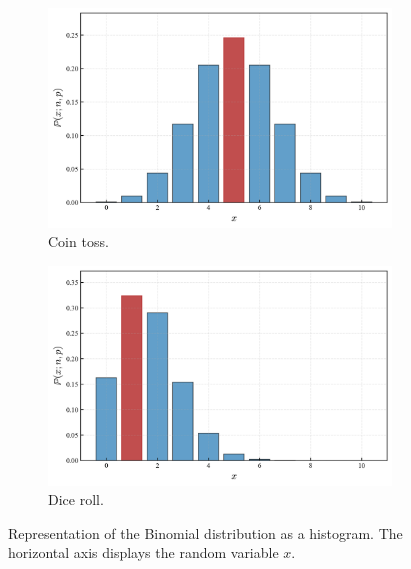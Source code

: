 \documentclass{book}
\begin{document}
\begin{figure}[ht]
    \centering
    \begin{subfigure}[b]{0.48\textwidth}
        \centering
        \includegraphics[width=\textwidth, height=0.7\textwidth]{figures/chapter2/binomial_1.png}
        \caption{Coin toss.}
        \label{fig:binomial1}
    \end{subfigure}
    \hfill
    \begin{subfigure}[b]{0.48\textwidth}
        \centering
        \includegraphics[width=\textwidth, height=0.7\textwidth]{figures/chapter2/binomial_2.png}
        \caption{Dice roll.}
        \label{fig:binomial2}
    \end{subfigure}
    \caption{Representation of the Binomial distribution as a histogram. The horizontal axis displays the random variable $x$.}
    \label{fig:binomial_comparison}
\end{figure}
\end{document}
